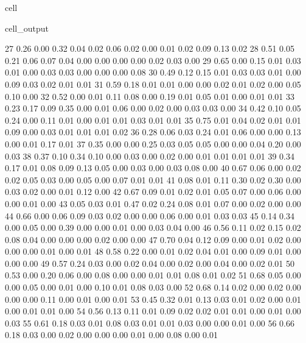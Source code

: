 \documentclass[letterpaper,10pt,english]{jupyterBook}
\begin{document}
\begin{sphinxuseclass}{cell}
\begin{sphinxVerbatimOutput}
\begin{sphinxuseclass}{cell_output}
\begin{sphinxVerbatim}[commandchars=\\\{\}]
        27	0.26 	0.00 	0.32 	0.04 	0.02 	0.06 	0.02 	0.00 	0.01 	0.02 	0.09 	0.13 	0.02
        28	0.51 	0.05 	0.21 	0.06 	0.07 	0.04 	0.00 	0.00 	0.00 	0.00 	0.02 	0.03 	0.00
        29	0.65 	0.00 	0.15 	0.01 	0.03 	0.01 	0.00 	0.03 	0.03 	0.00 	0.00 	0.00 	0.08
        30	0.49 	0.12 	0.15 	0.01 	0.03 	0.03 	0.01 	0.00 	0.09 	0.03 	0.02 	0.01 	0.01
        31	0.59 	0.18 	0.01 	0.01 	0.00 	0.00 	0.02 	0.01 	0.02 	0.00 	0.05 	0.10 	0.00
        32	0.52 	0.00 	0.01 	0.11 	0.08 	0.00 	0.19 	0.01 	0.05 	0.01 	0.00 	0.01 	0.01
        33	0.23 	0.17 	0.09 	0.35 	0.00 	0.01 	0.06 	0.00 	0.02 	0.00 	0.03 	0.03 	0.00
        34	0.42 	0.10 	0.05 	0.24 	0.00 	0.11 	0.01 	0.00 	0.01 	0.01 	0.03 	0.01 	0.01
        35	0.75 	0.01 	0.04 	0.02 	0.01 	0.01 	0.09 	0.00 	0.03 	0.01 	0.01 	0.01 	0.02
        36	0.28 	0.06 	0.03 	0.24 	0.01 	0.06 	0.00 	0.00 	0.13 	0.00 	0.01 	0.17 	0.01
        37	0.35 	0.00 	0.00 	0.25 	0.03 	0.05 	0.05 	0.00 	0.00 	0.04 	0.20 	0.00 	0.03
        38	0.37 	0.10 	0.34 	0.10 	0.00 	0.03 	0.00 	0.02 	0.00 	0.01 	0.01 	0.01 	0.01
        39	0.34 	0.17 	0.01 	0.08 	0.09 	0.13 	0.05 	0.00 	0.03 	0.00 	0.03 	0.08 	0.00
        40	0.67 	0.06 	0.00 	0.02 	0.02 	0.05 	0.03 	0.00 	0.05 	0.00 	0.07 	0.01 	0.01
        41	0.08 	0.01 	0.11 	0.30 	0.02 	0.30 	0.00 	0.03 	0.02 	0.00 	0.01 	0.12 	0.00
        42	0.67 	0.09 	0.01 	0.02 	0.01 	0.05 	0.07 	0.00 	0.06 	0.00 	0.00 	0.01 	0.00
        43	0.05 	0.03 	0.01 	0.47 	0.02 	0.24 	0.08 	0.01 	0.07 	0.00 	0.02 	0.00 	0.00
        44	0.66 	0.00 	0.06 	0.09 	0.03 	0.02 	0.00 	0.00 	0.06 	0.00 	0.01 	0.03 	0.03
        45	0.14 	0.34 	0.00 	0.05 	0.00 	0.39 	0.00 	0.00 	0.01 	0.00 	0.03 	0.04 	0.00
        46	0.56 	0.11 	0.02 	0.15 	0.02 	0.08 	0.04 	0.00 	0.00 	0.00 	0.02 	0.00 	0.00
        47	0.70 	0.04 	0.12 	0.09 	0.00 	0.01 	0.02 	0.00 	0.00 	0.00 	0.01 	0.00 	0.01
        48	0.58 	0.22 	0.00 	0.01 	0.02 	0.04 	0.01 	0.00 	0.09 	0.01 	0.00 	0.00 	0.00
        49	0.57 	0.24 	0.03 	0.00 	0.02 	0.04 	0.00 	0.02 	0.00 	0.04 	0.00 	0.02 	0.01
        50	0.53 	0.00 	0.20 	0.06 	0.00 	0.08 	0.00 	0.00 	0.01 	0.01 	0.08 	0.01 	0.02
        51	0.68 	0.05 	0.00 	0.00 	0.05 	0.00 	0.01 	0.00 	0.10 	0.01 	0.08 	0.03 	0.00
        52	0.68 	0.14 	0.02 	0.00 	0.02 	0.00 	0.00 	0.00 	0.11 	0.00 	0.01 	0.00 	0.01
        53	0.45 	0.32 	0.01 	0.13 	0.03 	0.01 	0.02 	0.00 	0.01 	0.00 	0.01 	0.01 	0.00
        54	0.56 	0.13 	0.11 	0.01 	0.09 	0.02 	0.02 	0.01 	0.01 	0.00 	0.01 	0.00 	0.03
        55	0.61 	0.18 	0.03 	0.01 	0.08 	0.03 	0.01 	0.01 	0.03 	0.00 	0.00 	0.01 	0.00
        56	0.66 	0.18 	0.03 	0.00 	0.02 	0.00 	0.00 	0.00 	0.01 	0.00 	0.08 	0.00 	0.01

\end{sphinxVerbatim}
\end{sphinxuseclass}
\end{sphinxVerbatimOutput}
\end{sphinxuseclass}
\end{document}
